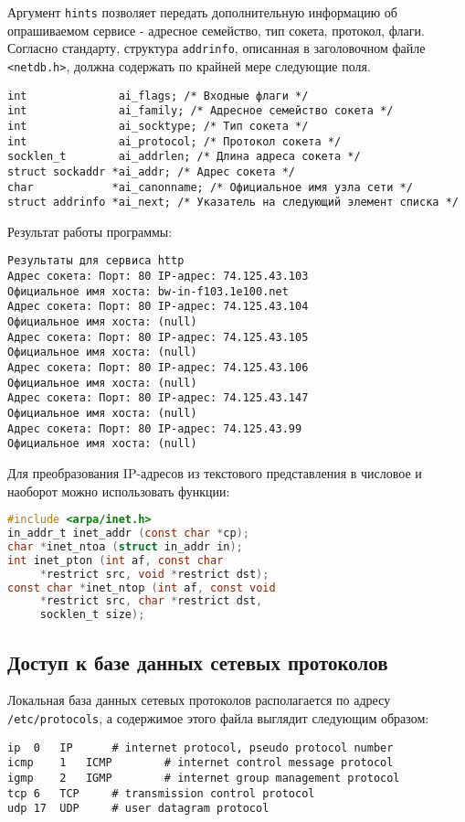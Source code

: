 Аргумент {\tt hints} позволяет передать дополнительную информацию об опрашиваемом сервисе - адресное семейство, тип сокета, протокол, флаги. 
Согласно стандарту, структура {\tt addrinfo}, описанная в заголовочном файле {\tt <netdb.h>}, должна содержать по крайней мере следующие поля. 

\begin{verbatim}
int              ai_flags; /* Входные флаги */
int              ai_family; /* Адресное семейство сокета */
int              ai_socktype; /* Тип сокета */
int              ai_protocol; /* Протокол сокета */
socklen_t        ai_addrlen; /* Длина адреса сокета */
struct sockaddr *ai_addr; /* Адрес сокета */
char            *ai_canonname; /* Официальное имя узла сети */
struct addrinfo *ai_next; /* Указатель на следующий элемент списка */
\end{verbatim}



Результат работы программы:
\begin{verbatim}
Результаты для сервиса http
Адрес сокета: Порт: 80 IP-адрес: 74.125.43.103
Официальное имя хоста: bw-in-f103.1e100.net
Адрес сокета: Порт: 80 IP-адрес: 74.125.43.104
Официальное имя хоста: (null)
Адрес сокета: Порт: 80 IP-адрес: 74.125.43.105
Официальное имя хоста: (null)
Адрес сокета: Порт: 80 IP-адрес: 74.125.43.106
Официальное имя хоста: (null)
Адрес сокета: Порт: 80 IP-адрес: 74.125.43.147
Официальное имя хоста: (null)
Адрес сокета: Порт: 80 IP-адрес: 74.125.43.99
Официальное имя хоста: (null)
\end{verbatim}

Для преобразования IP-адресов из текстового представления в числовое и наоборот можно использовать функции:
\begin{lstlisting}[language=C]
#include <arpa/inet.h>
in_addr_t inet_addr (const char *cp);
char *inet_ntoa (struct in_addr in);
int inet_pton (int af, const char 
     *restrict src, void *restrict dst);
const char *inet_ntop (int af, const void 
     *restrict src, char *restrict dst, 
     socklen_t size);
\end{lstlisting}

\subsection{Доступ к базе данных сетевых протоколов}
Локальная база данных сетевых протоколов располагается по адресу {\tt /etc/protocols}, а содержимое этого файла выглядит следующим образом:
\begin{verbatim}
ip	0	IP		# internet protocol, pseudo protocol number
icmp	1	ICMP		# internet control message protocol
igmp	2	IGMP		# internet group management protocol
tcp	6	TCP		# transmission control protocol
udp	17	UDP		# user datagram protocol
\end{verbatim}

